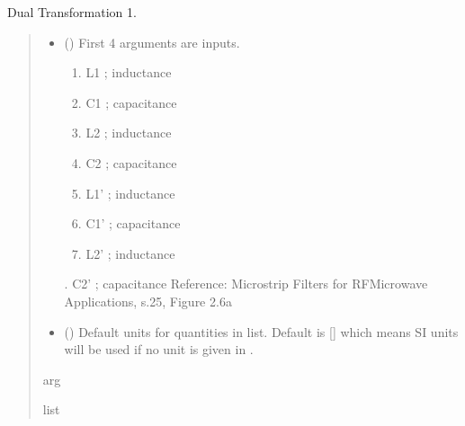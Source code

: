 \documentclass[letterpaper,10pt,english]{sphinxmanual}
\begin{document}

\begin{fulllineitems}
\label{\detokenize{components:components.DualTransformation1}}
\pysigstartsignatures
{}
\pysigstopsignatures
\sphinxAtStartPar
Dual Transformation 1.
\begin{quote}\begin{description}
\begin{itemize}
\item {} 
\sphinxAtStartPar
{} () \textendash{} 
\sphinxAtStartPar
First 4 arguments are inputs.
\begin{enumerate}
%
\item {} 
\sphinxAtStartPar
L1 ; inductance

\item {} 
\sphinxAtStartPar
C1 ; capacitance

\item {} 
\sphinxAtStartPar
L2 ; inductance

\item {} 
\sphinxAtStartPar
C2 ; capacitance

\item {} 
\sphinxAtStartPar
L1’ ; inductance

\item {} 
\sphinxAtStartPar
C1’ ; capacitance

\item {} 
\sphinxAtStartPar
L2’ ; inductance

\end{enumerate}

.  C2’ ; capacitance
Reference:  Microstrip Filters for RF\sphinxhyphen{}Microwave Applications, s.25, Figure 2.6a


\item {} 
\sphinxAtStartPar
{} (\sphinxstyleliteralemphasis{\sphinxupquote{, }}) \textendash{} Default units for quantities in  list. Default is {[}{]} which means SI units will be used if no unit is given in .

\end{itemize}

\sphinxAtStartPar
arg

\sphinxAtStartPar
list

\end{description}\end{quote}

\end{fulllineitems}
\end{document}
